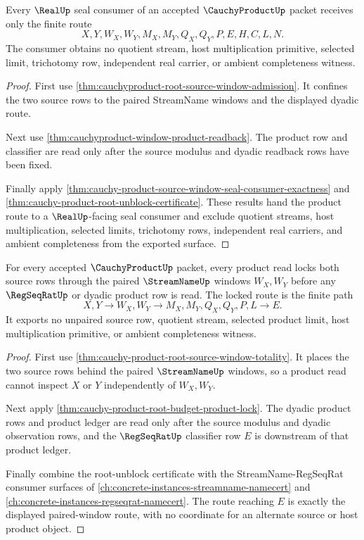 \begin{theorem}
\label{thm:cauchyproduct-product-seal-nonescape}
Every $\RealUp$ seal consumer of an accepted $\CauchyProductUp$ packet receives only the finite route
$$
X,Y,W_X,W_Y,M_X,M_Y,Q_X,Q_Y,P,E,H,C,L,N .
$$
The consumer obtains no quotient stream, host multiplication primitive, selected limit, trichotomy row, independent real carrier, or ambient completeness witness.
\end{theorem}
\begin{proof}
First use \autoref{thm:cauchyproduct-root-source-window-admission}. It confines the two source rows to the paired StreamName windows and the displayed dyadic route.

Next use \autoref{thm:cauchyproduct-window-product-readback}. The product row and classifier are read only after the source modulus and dyadic readback rows have been fixed.

Finally apply \autoref{thm:cauchy-product-source-window-seal-consumer-exactness} and \autoref{thm:cauchy-product-root-unblock-certificate}. These results hand the product route to a $\RealUp$-facing seal consumer and exclude quotient streams, host multiplication, selected limits, trichotomy rows, independent real carriers, and ambient completeness from the exported surface.
\end{proof}

\begin{theorem}
\label{thm:cauchy-product-streamname-regseqrat-source-lock}
For every accepted $\CauchyProductUp$ packet, every product read locks both source rows through the paired $\StreamNameUp$ windows $W_X,W_Y$ before any $\RegSeqRatUp$ or dyadic product row is read. The locked route is the finite path
$$
X,Y \to W_X,W_Y \to M_X,M_Y,Q_X,Q_Y,P,L \to E .
$$
It exports no unpaired source row, quotient stream, selected product limit, host multiplication primitive, or ambient completeness witness.
\end{theorem}
\begin{proof}
First use \autoref{thm:cauchy-product-root-source-window-totality}. It places the two source rows behind the paired $\StreamNameUp$ windows, so a product read cannot inspect $X$ or $Y$ independently of $W_X,W_Y$.

Next apply \autoref{thm:cauchy-product-root-budget-product-lock}. The dyadic product rows and product ledger are read only after the source modulus and dyadic observation rows, and the $\RegSeqRatUp$ classifier row $E$ is downstream of that product ledger.

Finally combine the root-unblock certificate with the StreamName-RegSeqRat consumer surfaces of \autoref{ch:concrete-instances-streamname-namecert} and \autoref{ch:concrete-instances-regseqrat-namecert}. The route reaching $E$ is exactly the displayed paired-window route, with no coordinate for an alternate source or host product object.
\end{proof}

